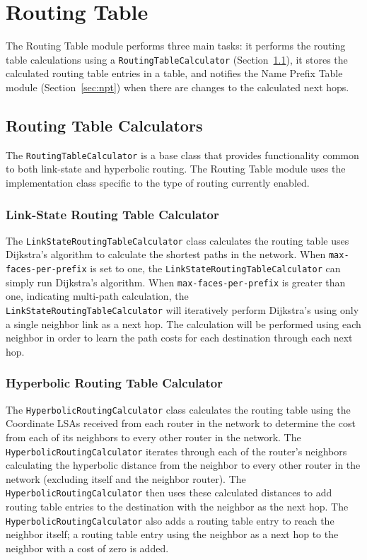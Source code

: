 \section{Routing Table}
\label{sec:routing-table}

The Routing Table module performs three main tasks: it performs the routing table calculations using a \texttt{RoutingTableCalculator} (Section~\ref{sec:routing-table-calculator}),
it stores the calculated routing table entries in a table, and notifies the Name Prefix Table module (Section~\ref{sec:npt}) when there are changes to the calculated next hops.

\subsection{Routing Table Calculators}
\label{sec:routing-table-calculator}

The \texttt{RoutingTableCalculator} is a base class that provides functionality common to both link-state and hyperbolic routing.
The Routing Table module uses the implementation class specific to the type of routing currently enabled.

\subsubsection{Link-State Routing Table Calculator}

The \texttt{LinkStateRoutingTableCalculator} class calculates the routing table uses Dijkstra's algorithm to calculate the shortest paths in the network.
When \texttt{max-faces-per-prefix} is set to one, the \texttt{LinkStateRoutingTableCalculator} can simply run Dijkstra's algorithm.
When \texttt{max-faces-per-prefix} is greater than one, indicating multi-path calculation, the \\ \texttt{LinkStateRoutingTableCalculator} will iteratively perform Dijkstra's using only a single neighbor link as a next hop.
The calculation will be performed using each neighbor in order to learn the path costs for each destination through each next hop.

\subsubsection{Hyperbolic Routing Table Calculator}

The \texttt{HyperbolicRoutingCalculator} class calculates the routing table using the Coordinate LSAs received from each router in the network to determine the cost from each of its neighbors to every other router in the network.
The \texttt{HyperbolicRoutingCalculator} iterates through each of the router's neighbors calculating the hyperbolic distance from the neighbor to every other router in the network (excluding itself and the neighbor router).
The \texttt{HyperbolicRoutingCalculator} then uses these calculated distances to add routing table entries to the destination with the neighbor as the next hop.
The \texttt{HyperbolicRoutingCalculator} also adds a routing table entry to reach the neighbor itself; a routing table entry using the neighbor as a next hop to the neighbor with a cost of zero is added.

